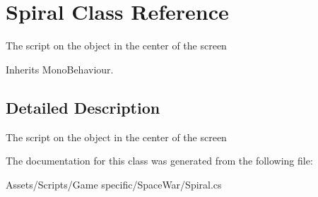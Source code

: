 \hypertarget{class_spiral}{\section{Spiral Class Reference}
\label{class_spiral}
}


The script on the object in the center of the screen  




Inherits Mono\-Behaviour.



\subsection{Detailed Description}
The script on the object in the center of the screen 



The documentation for this class was generated from the following file\-:\begin{DoxyCompactItemize}
\item 
Assets/\-Scripts/\-Game specific/\-Space\-War/Spiral.\-cs\end{DoxyCompactItemize}
